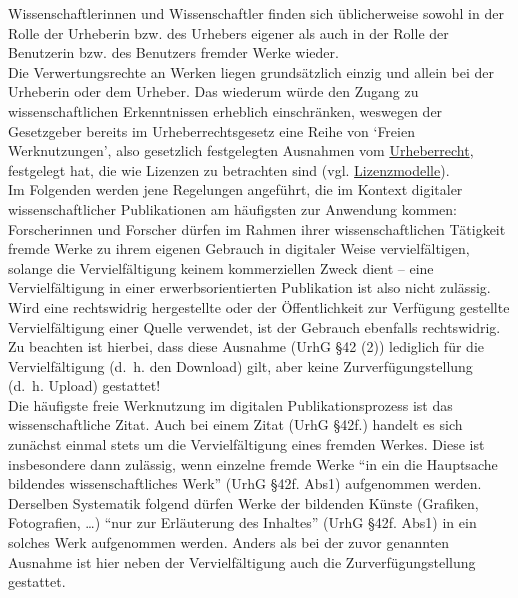 \documentclass{article}
\begin{document}
    Wissenschaftlerinnen und Wissenschaftler finden sich üblicherweise sowohl in der
                  Rolle der Urheberin bzw. des Urhebers eigener als auch in der Rolle der Benutzerin
                  bzw. des Benutzers fremder Werke wieder. \\
            
        Die Verwertungsrechte an Werken liegen grundsätzlich einzig und allein bei der
                  Urheberin oder dem Urheber. Das wiederum würde den Zugang zu wissenschaftlichen
                  Erkenntnissen erheblich einschränken, weswegen der Gesetzgeber bereits im
                  Urheberrechtsgesetz eine Reihe von ‘Freien Werknutzungen’, also gesetzlich
                  festgelegten Ausnahmen vom \href{http://gams.uni-graz.at/o:konde.44}{Urheberrecht}, festgelegt hat, die wie Lizenzen zu betrachten sind (vgl.
                     \href{http://gams.uni-graz.at/o:konde.45}{Lizenzmodelle}).\\
            
        Im Folgenden werden jene Regelungen angeführt, die im Kontext digitaler
                  wissenschaftlicher Publikationen am häufigsten zur Anwendung kommen:\\
            
        Forscherinnen und Forscher dürfen im Rahmen ihrer wissenschaftlichen Tätigkeit
                  fremde Werke zu ihrem eigenen Gebrauch in digitaler Weise vervielfältigen, solange
                  die Vervielfältigung keinem kommerziellen Zweck dient – eine Vervielfältigung in
                  einer erwerbsorientierten Publikation ist also nicht zulässig. Wird eine
                  rechtswidrig hergestellte oder der Öffentlichkeit zur Verfügung gestellte
                  Vervielfältigung einer Quelle verwendet, ist der Gebrauch ebenfalls rechtswidrig.
                  Zu beachten ist hierbei, dass diese Ausnahme (UrhG §42 (2)) lediglich für die
                  Vervielfältigung (d. h. den Download) gilt, aber keine Zurverfügungstellung (d. h.
                  Upload) gestattet!\\
            
        Die häufigste freie Werknutzung im digitalen Publikationsprozess ist das
                  wissenschaftliche Zitat. Auch bei einem Zitat (UrhG §42f.) handelt es sich
                  zunächst einmal stets um die Vervielfältigung eines fremden Werkes. Diese ist
                  insbesondere dann zulässig, wenn einzelne fremde Werke “in ein die Hauptsache
                  bildendes wissenschaftliches Werk” (UrhG §42f. Abs1) aufgenommen werden. Derselben
                  Systematik folgend dürfen Werke der bildenden Künste (Grafiken, Fotografien, …)
                  “nur zur Erläuterung des Inhaltes” (UrhG §42f. Abs1) in ein solches Werk
                  aufgenommen werden. Anders als bei der zuvor genannten Ausnahme ist hier neben der
                  Vervielfältigung auch die Zurverfügungstellung gestattet.\\
            
\end{document}
